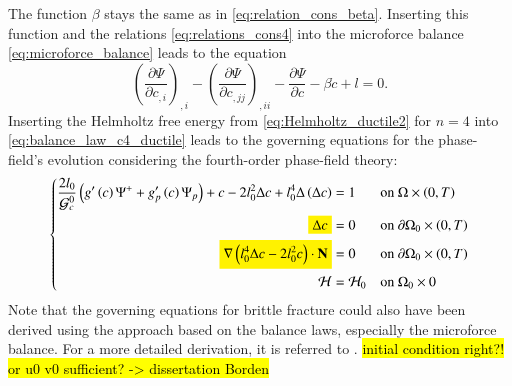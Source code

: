 The function $\beta$ stays the same as in \eqref{eq:relation_cons_beta}. Inserting this function and the relations \eqref{eq:relations_cons4} into the microforce balance \eqref{eq:microforce_balance} leads to the equation
\begin{equation} \label{eq:balance_law_c4_ductile}
	\left(\dfrac{\partial\Psi}{\partial c_{,i}}\right)_{,i}-\left(\dfrac{\partial\Psi}{\partial c_{,jj}}\right)_{,ii}-\dfrac{\partial\Psi}{\partial c}-\beta\dot{c}+l=0.
\end{equation}
Inserting the Helmholtz free energy from \eqref{eq:Helmholtz_ductile2} for $n=4$ into \eqref{eq:balance_law_c4_ductile} leads to the governing equations for the phase-field's evolution considering the fourth-order phase-field theory:
\begin{equation} \label{eq:c4_equil_ductile}
	\left\{\begin{alignedat}{2}
		\dfrac{2l_{0}}{\mathcal{G}_{c}^{0}}\left(g'\left(c\right)\Psi^{+}+g_{p}'\left(c\right)\Psi_{p}\right) + c - 2l_{0}^{2}\Delta c +l_{0}^{4}\Delta\left(\Delta c\right) &= 1 && \quad\text{on } \Omega\times\left(0,T\right) \\
		\hl{\Delta c} &= 0 && \quad \text{on } \partial\Omega_{0}\times\left(0,T\right) \\
		\hl{\nabla\left(l_{0}^{4}\Delta c-2l_{0}^{2}c\right)\cdot\mathbf{N}} &= 0 && \quad \text{on } \partial\Omega_{0}\times\left(0,T\right) \\
\mathcal{H} &= \mathcal{H}_{0} && \quad \text{on } \Omega_{0}\times0  
	\end{alignedat}\right.
\end{equation}
Note that the governing equations for brittle fracture could also have been derived using the approach based on the balance laws, especially the microforce balance. For a more detailed derivation, it is referred to \citep{11_PF_DissBorden}. \hl{initial condition right?! or u0 v0 sufficient? -> dissertation Borden}
